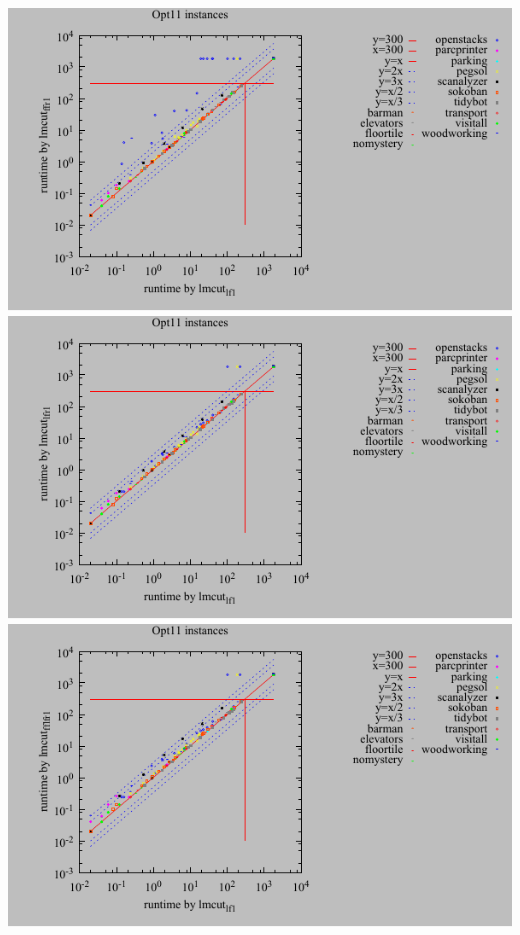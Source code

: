 \includegraphics{tables/opt11-time-lmcut_lf-lmcut_ffr.pdf}
\linebreak
\includegraphics{tables/opt11-time-lmcut_lf-lmcut_lfr.pdf}
\linebreak
\includegraphics{tables/opt11-time-lmcut_lf-lmcut_fflfr.pdf}
\linebreak
